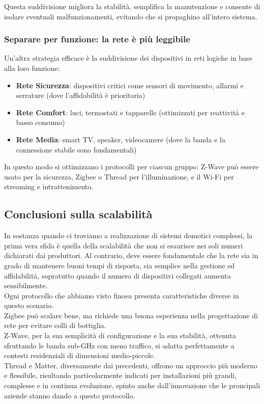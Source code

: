 Questa suddivisione migliora la stabilità, semplifica la manutenzione e consente di isolare eventuali malfunzionamenti, evitando che si propaghino all’intero sistema.

\subsubsection{Separare per funzione: la rete è più leggibile}

Un'altra strategia efficace è la suddivisione dei dispositivi in reti logiche in base alla loro funzione:

\begin{itemize}
    \item \textbf{Rete Sicurezza}: dispositivi critici come sensori di movimento, allarmi e serrature (dove l'affidabilità è prioritaria)
    \item \textbf{Rete Comfort}: luci, termostati e tapparelle (ottimizzati per reattività e basso consumo)
    \item \textbf{Rete Media}: smart TV, speaker, videocamere (dove la banda e la connessione stabile sono fondamentali)
\end{itemize}

In questo modo si ottimizzano i protocolli per ciascun gruppo: Z-Wave può essere usato per la sicurezza, Zigbee o Thread per l’illuminazione, e il Wi-Fi per streaming e intrattenimento.

\subsection{Conclusioni sulla scalabilità}

In sostanza quando ci troviamo a realizzazione di sistemi domotici complessi, la prima vera sfida è quella della scalabilità che non si esaurisce nei soli numeri dichiarati dai produttori. Al contrario, deve essere fondamentale che la rete sia in grado di mantenere buoni tempi di risposta, sia semplice nella gestione ed affidabilità, sopratutto  quando il numero di dispositivi collegati aumenta sensibilmente.\\

Ogni protocollo che abbiamo visto finoea presenta caratteristiche diverse in questo scenario.\\
Zigbee può scalare bene, ma richiede una buona esperienza nella progettazione di rete per evitare colli di bottiglia.\\
Z-Wave, per la sua semplicità di configurazione e la sua stabilità, ottenuta sfruttando le banda sub-GHz con meno traffico, si adatta perfettamente a contesti residenziali di dimensioni medio-piccole.\\
Thread e Matter, diversamente dai precedenti, offrono un approccio più moderno e flessibile, risultando particolarmente indicati per installazioni più grandi, complesse e in continua evoluzione, spinto anche dall'innovazione che le proncipali aziende stanno dando a questo protocollo.\\

